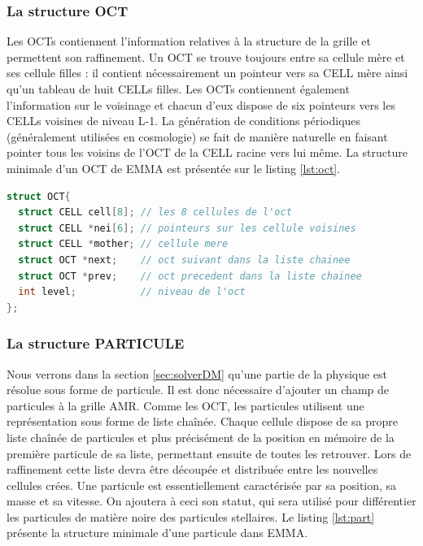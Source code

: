 \subsubsection{La structure OCT}
Les OCTs contiennent l'information relatives à la structure de la grille et permettent son raffinement.
Un OCT se trouve toujours entre sa cellule mère et ses cellule filles : il contient nécessairement un pointeur vers sa CELL mère ainsi qu'un tableau de huit CELLs filles.
Les OCTs contiennent également l'information sur le voisinage et chacun d'eux dispose de six pointeurs vers les CELLs voisines de niveau L-1.
La génération de conditions périodiques (généralement utilisées en cosmologie) se fait de manière naturelle en faisant pointer tous les voisins de l'OCT de la CELL racine vers lui même.
La structure minimale d'un OCT de EMMA est présentée sur le listing \ref{lst:oct}.
\begin{lstlisting}[float=bth,language=C,frame=tb,caption={La structure OCT de EMMA},label=lst:oct]
struct OCT{
  struct CELL cell[8]; // les 8 cellules de l'oct
  struct CELL *nei[6]; // pointeurs sur les cellule voisines
  struct CELL *mother; // cellule mere
  struct OCT *next;    // oct suivant dans la liste chainee
  struct OCT *prev;    // oct precedent dans la liste chainee
  int level;           // niveau de l'oct
};
\end{lstlisting}


\subsubsection{La structure PARTICULE}
\label{sec:PART}

Nous verrons dans la section \ref{sec:solverDM} qu'une partie de la physique est résolue sous forme de particule.
Il est donc nécessaire d'ajouter un champ de particules à la grille \ac{AMR}.
Comme les OCT, les particules utilisent une représentation sous forme de liste chaînée.
Chaque cellule dispose de sa propre liste chaînée de particules et plus précisément de la position en mémoire de la première particule de sa liste, permettant ensuite de toutes les retrouver.
Lors de raffinement cette liste devra être découpée et distribuée entre les nouvelles cellules crées.
Une particule est essentiellement caractérisée par sa position, sa masse et sa vitesse.
On ajoutera à ceci son statut, qui sera utilisé pour différentier les particules de matière noire des particules stellaires. 
Le listing \ref{lst:part} présente la structure minimale d'une particule dans EMMA.


